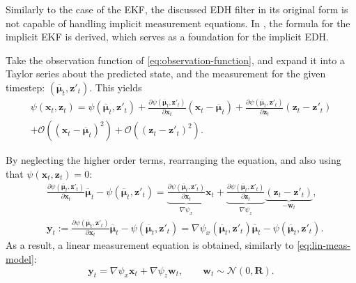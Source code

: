 Similarly to the case of the EKF, the discussed EDH filter in its original form is not capable of
handling implicit measurement equations.
In \cite{Zhang2012}, the formula for the implicit EKF is derived,
which serves as a foundation for the implicit EDH.

Take the observation function of \eqref{eq:observation-function},
and expand it into a Taylor series about the predicted state, and the measurement for the given timestep: $\left(\overline{\boldsymbol\mu}_t,\mathbf{z}'_t\right)$. This yields
\begin{align}
  \psi(\mathbf{x}_t,\mathbf{z}_t) = \psi(\overline{\boldsymbol\mu}_t,\mathbf{z}'_t)
  + \frac{\partial \psi(\overline{\boldsymbol\mu}_t,\mathbf{z}'_t)}{\partial \mathbf{x}_t}(\mathbf{x}_t-\overline{\boldsymbol\mu}_t)
  + \frac{\partial \psi(\overline{\boldsymbol\mu}_t,\mathbf{z}'_t)}{\partial \mathbf{z}_t}(\mathbf{z}_t-\mathbf{z}'_t) \\
  + \mathcal{O}((\mathbf{x}_t-\overline{\boldsymbol\mu}_t)^2)
  + \mathcal{O}((\mathbf{z}_t-\mathbf{z}'_t)^2) \nonumber.
\end{align}

By neglecting the higher order terms, rearranging the equation, and also using that \linebreak
$\psi(\mathbf{x}_t,\mathbf{z}_t) = 0$:
\begin{align}
   & \frac{\partial \psi(\overline{\boldsymbol\mu}_t,\mathbf{z}'_t)}{\partial \mathbf{x}_t}\overline{\boldsymbol\mu}_t
  - \psi(\overline{\boldsymbol\mu}_t,\mathbf{z}'_t) = \underbrace{\frac{\partial \psi(\overline{\boldsymbol\mu}_t,\mathbf{z}'_t)}{\partial \mathbf{x}_t}}_{\nabla \psi_x}\mathbf{x}_t + \underbrace{\frac{\partial \psi(\overline{\boldsymbol\mu}_t,\mathbf{z}'_t)}{\partial \mathbf{z}_t}}_{\nabla \psi_z}\underbrace{(\mathbf{z}_t-\mathbf{z}'_t)}_{-\mathbf{w}_t}, \\
   & \mathbf{y}_t :=  \frac{\partial \psi(\overline{\boldsymbol\mu}_t,\mathbf{z}'_t)}{\partial \mathbf{x}_t}\overline{\boldsymbol\mu}_t
  - \psi(\overline{\boldsymbol\mu}_t,\mathbf{z}'_t) = \nabla\psi_x(\overline{\boldsymbol\mu}_t,\mathbf{z}'_t)\overline{\boldsymbol\mu}_t-\psi(\overline{\boldsymbol\mu}_t,\mathbf{z}'_t) \label{eq:edh-implicit-y}.
\end{align}
As a result, a linear measurement equation is obtained, similarly to \eqref{eq:lin-meas-model}:
\begin{equation}
  \mathbf{y}_t = \nabla \psi_x \mathbf{x}_t + \nabla \psi_z\mathbf{w}_t,\quad\quad \mathbf{w}_t \sim \mathcal{N}(0,\mathbf{R}).
\end{equation}

